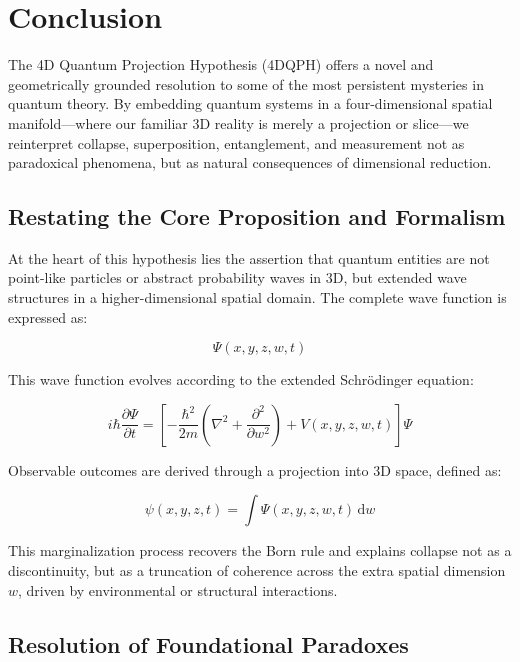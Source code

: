 \documentclass[12pt]{article}
\begin{document}
\section{Conclusion}

The 4D Quantum Projection Hypothesis (4DQPH) offers a novel and geometrically grounded resolution to some of the most persistent mysteries in quantum theory. By embedding quantum systems in a four-dimensional spatial manifold—where our familiar 3D reality is merely a projection or slice—we reinterpret collapse, superposition, entanglement, and measurement not as paradoxical phenomena, but as natural consequences of dimensional reduction.

\subsection*{Restating the Core Proposition and Formalism}

At the heart of this hypothesis lies the assertion that quantum entities are not point-like particles or abstract probability waves in 3D, but extended wave structures in a higher-dimensional spatial domain. The complete wave function is expressed as:

\begin{equation}
\Psi(x, y, z, w, t)
\end{equation}

This wave function evolves according to the extended Schrödinger equation:

\begin{equation}
i\hbar \frac{\partial \Psi}{\partial t} = \left[ -\frac{\hbar^2}{2m} \left( \nabla^2 + \frac{\partial^2}{\partial w^2} \right) + V(x, y, z, w, t) \right] \Psi
\end{equation}

Observable outcomes are derived through a projection into 3D space, defined as:

\begin{equation}
\psi(x, y, z, t) = \int \Psi(x, y, z, w, t) \, \mathrm{d}w
\end{equation}

This marginalization process recovers the Born rule and explains collapse not as a discontinuity, but as a truncation of coherence across the extra spatial dimension \( w \), driven by environmental or structural interactions.

\subsection*{Resolution of Foundational Paradoxes}
\end{document}

